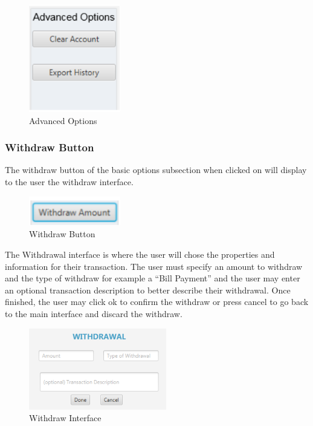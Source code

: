 \documentclass[12pt]{article}
\begin{document}
\begin{figure}[h!]
  \centering
  \includegraphics[width=40mm]{advanceoption.PNG}
  \caption{Advanced Options}
\end{figure}

\subsubsection{Withdraw Button}
The withdraw button of the basic options subsection when clicked on will display to the user the withdraw interface.

\begin{figure}[h!]
  \centering
  \includegraphics[width=40mm]{withdrawbutton.PNG}
  \caption{Withdraw Button}
\end{figure}

The Withdrawal interface is where the user will chose the properties and information for their transaction. The user must specify an amount to withdraw and the type of withdraw for example a “Bill Payment” and the user may enter an optional transaction description to better describe their withdrawal. Once finished, the user may click ok to confirm the withdraw or press cancel to go back to the main interface and discard the withdraw.

\begin{figure}[h!]
  \centering
  \includegraphics[width=60mm]{withdrawinterface.PNG}
  \caption{Withdraw Interface}
\end{figure}
\end{document}
